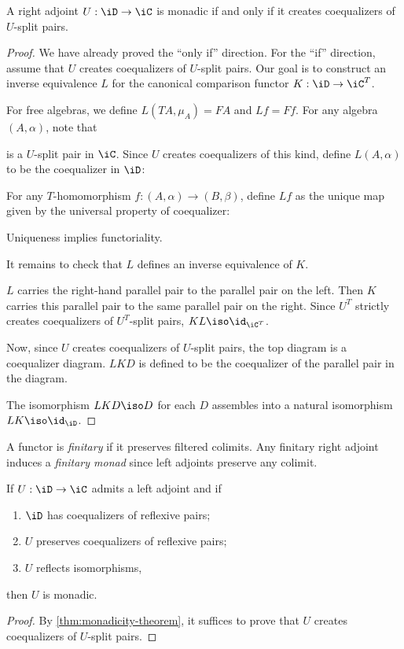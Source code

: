 \documentclass{amsart}
\begin{document}
\begin{thm}\label{thm:monadicity-theorem}
  A right adjoint $U : \iD \to \iC$ is monadic if and only if it creates coequalizers of $U$-split pairs.
\end{thm}
\begin{proof}
  We have already proved the ``only if'' direction.
  For the ``if'' direction, assume that $U$ creates coequalizers of $U$-split pairs.
  Our goal is to construct an inverse equivalence $L$ for the canonical comparison functor $K : \iD \to \iC^{T}$.

  For free algebras, we define $L(TA,\mu_{A}) = FA$ and $Lf = Ff$.
  For any algebra $(A, \alpha)$, note that
  
  is a $U$-split pair in $\iC$.
  Since $U$ creates coequalizers of this kind, define $L(A,\alpha)$ to be the coequalizer in $\iD$:
  
  For any $T$-homomorphism $f : (A, \alpha) \to (B, \beta)$, define $Lf$ as the unique map given by the universal property of coequalizer:
  
  Uniqueness implies functoriality.

  It remains to check that $L$ defines an inverse equivalence of $K$.
  
  $L$ carries the right-hand parallel pair to the parallel pair on the left.
  Then $K$ carries this parallel pair to the same parallel pair on the right.
  Since $U^{T}$ strictly creates coequalizers of $U^{T}$-split pairs, $KL \iso \id_{\iC^{T}}$.

  Now, since $U$ creates coequalizers of $U$-split pairs, the top diagram is a coequalizer diagram.
  $LKD$ is defined to be the coequalizer of the parallel pair in the diagram.
  
  The isomorphism $LKD \iso D$ for each $D$ assembles into a natural isomorphism $LK \iso \id_{\iD}$.
\end{proof}

\begin{defn}
  A functor is \emph{finitary} if it preserves filtered colimits.
  Any finitary right adjoint induces a \emph{finitary monad} since left adjoints preserve any colimit.
\end{defn}

\begin{thm}
  If $U : \iD \to \iC$ admits a left adjoint and if
  \begin{enumerate}
  \item $\iD$ has coequalizers of reflexive pairs;
  \item $U$ preserves coequalizers of reflexive pairs;
  \item $U$ reflects isomorphisms,
  \end{enumerate}
  then $U$ is monadic.
\end{thm}
\begin{proof}
  By \cref{thm:monadicity-theorem}, it suffices to prove that $U$ creates coequalizers of $U$-split pairs.
\end{proof}



\end{document}

